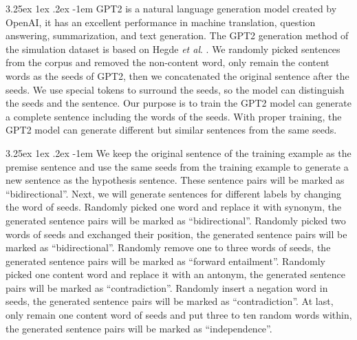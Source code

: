 \documentclass[12pt]{article}
\makeatletter
\renewcommand\paragraph{\@startsection{paragraph}{5}{\z@}%
  {3.25ex \@plus1ex \@minus.2ex}%
  {-1em}%
  {\normalfont\normalsize\bfseries}}
\makeatother
\begin{document}
\begin{CJK*}{UTF8}{bkai}
\begin{spacing}{1.77}
\paragraph{}
GPT2 \cite{radford2019language} is a natural language generation model created by OpenAI, it has an excellent performance in machine translation, question answering, summarization, and text generation. The GPT2 generation method of the simulation dataset is based on Hegde \emph{et al}. \cite{hegde2020unsupervised}. We randomly picked sentences from the corpus and removed the non-content word, only remain the content words as the seeds of GPT2, then we concatenated the original sentence after the seeds. We use special tokens to surround the seeds, so the model can distinguish the seeds and the sentence. Our purpose is to train the GPT2 model can generate a complete sentence including the words of the seeds. With proper training, the GPT2 model can generate different but similar sentences from the same seeds.

\paragraph{}
We keep the original sentence of the training example as the premise sentence and use the same seeds from the training example to generate a new sentence as the hypothesis sentence. These sentence pairs will be marked as ``bidirectional''. Next, we will generate sentences for different labels by changing the word of seeds. Randomly picked one word and replace it with synonym, the generated sentence pairs will be marked as ``bidirectional''. Randomly picked two words of seeds and exchanged their position, the generated sentence pairs will be marked as ``bidirectional''. Randomly remove one to three words of seeds, the generated sentence pairs will be marked as ``forward entailment''. Randomly picked one content word and replace it with an antonym, the generated sentence pairs will be marked as ``contradiction''. Randomly insert a negation word in seeds, the generated sentence pairs will be marked as ``contradiction''. At last, only remain one content word of seeds and put three to ten random words within, the generated sentence pairs will be marked as ``independence''.


\end{spacing}
\end{CJK*}
\end{document}
